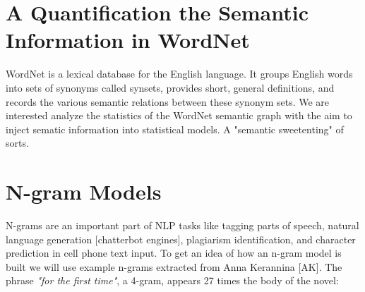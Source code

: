 \section{A Quantification the Semantic Information in WordNet}
 WordNet \cite{WORDNET} is a lexical database for the English language. It groups English words into sets of synonyms called synsets, provides short, general definitions, and records the various semantic relations between these synonym sets.  We are interested analyze the statistics of the WordNet semantic graph with the aim to inject sematic information into statistical models.  A "semantic sweetenting" of sorts.

\section{N-gram Models}
N-grams are an important part of NLP tasks like tagging parts of speech, natural language generation [chatterbot engines], plagiarism identification, and character prediction in cell phone text input.  To get an idea of how an  n-gram model is built we will use example n-grams extracted from Anna Kerannina [AK].  The phrase \emph{"for the first time"}, a 4-gram, appears 27 times the body of the novel:
